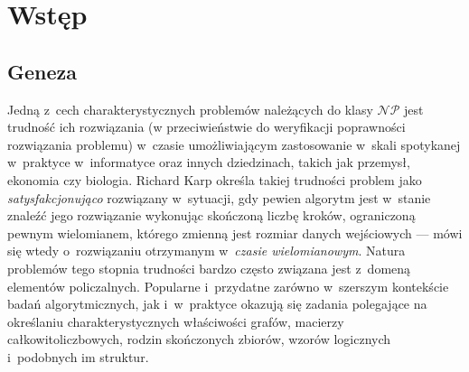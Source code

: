 \chapter{Wstęp}\label{Chapter_Introduction}
\section{Geneza}\label{Section_Genesis}
\par{
  Jedną z~cech charakterystycznych problemów należących do klasy $\mathcal{NP}$ jest trudność ich rozwiązania (w przeciwieństwie do weryfikacji poprawności rozwiązania problemu) w~czasie umożliwiającym zastosowanie w~skali spotykanej w~praktyce w~informatyce oraz innych dziedzinach, takich jak przemysł, ekonomia czy biologia.
  Richard Karp określa takiej trudności problem jako \emph{satysfakcjonująco} rozwiązany w~sytuacji, gdy pewien algorytm jest w~stanie znaleźć jego rozwiązanie wykonując skończoną liczbę kroków, ograniczoną pewnym wielomianem, którego zmienną jest rozmiar danych wejściowych --- mówi się wtedy o~rozwiązaniu otrzymanym w~\emph{czasie wielomianowym}.
  Natura problemów tego stopnia trudności bardzo często związana jest z~domeną elementów policzalnych.
  Popularne i~przydatne zarówno w~szerszym kontekście badań algorytmicznych, jak i~w~praktyce okazują się zadania polegające na określaniu charakterystycznych właściwości grafów, macierzy całkowitoliczbowych, rodzin skończonych zbiorów, wzorów logicznych i~podobnych im struktur.
}
